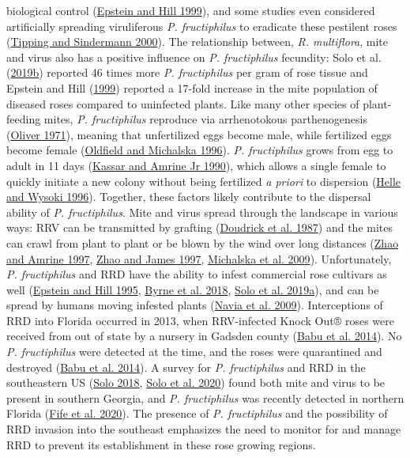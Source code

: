 \documentclass{ufdissertation}[overrideChapters] %
\begin{document}
{biological control (\protect\hyperlink{ref-Epstein1999}{Epstein and Hill 1999}), and some studies even considered artificially spreading viruliferous \emph{P. fructiphilus} to eradicate these pestilent roses (\protect\hyperlink{ref-Tipping2000}{Tipping and Sindermann 2000}). The relationship between, \emph{R. multiflora}, mite and virus also has a positive influence on \emph{P. fructiphilus} fecundity: Solo et al. (\protect\hyperlink{ref-Solo2019a}{2019b}) reported 46 times more \emph{P. fructiphilus} per gram of rose tissue and Epstein and Hill (\protect\hyperlink{ref-Epstein1999}{1999}) reported a 17-fold increase in the mite population of diseased roses compared to uninfected plants. Like many other species of plant-feeding mites, \emph{P. fructiphilus} reproduce via arrhenotokous parthenogenesis (\protect\hyperlink{ref-Oliver1971}{Oliver 1971}), meaning that unfertilized eggs become male, while fertilized eggs become female (\protect\hyperlink{ref-Oldfield1996b}{Oldfield and Michalska 1996}). \emph{P. fructiphilus} grows from egg to adult in 11 days (\protect\hyperlink{ref-Kassar1990}{Kassar and Amrine Jr 1990}), which allows a single female to quickly initiate a new colony without being fertilized \emph{a priori} to dispersion (\protect\hyperlink{ref-Helle1996}{Helle and Wysoki 1996}). Together, these factors likely contribute to the dispersal ability of \emph{P. fructiphilus}. Mite and virus spread through the landscape in various ways: RRV can be transmitted by grafting (\protect\hyperlink{ref-Doudrick1987}{Doudrick et al. 1987}) and the mites can crawl from plant to plant or be blown by the wind over long distances (\protect\hyperlink{ref-Zhao1997b}{Zhao and Amrine 1997}, \protect\hyperlink{ref-Zhao1997a}{Zhao and James 1997}, \protect\hyperlink{ref-Michalska2009}{Michalska et al. 2009}). Unfortunately, \emph{P. fructiphilus} and RRD have the ability to infest commercial rose cultivars as well (\protect\hyperlink{ref-Epstein1995}{Epstein and Hill 1995}, \protect\hyperlink{ref-Byrne2018}{Byrne et al. 2018}, \protect\hyperlink{ref-Solo2019}{Solo et al. 2019a}), and can be spread by humans moving infested plants (\protect\hyperlink{ref-Navia2009}{Navia et al. 2009}). Interceptions of RRD into Florida occurred in 2013, when RRV-infected Knock Out® roses were received from out of state by a nursery in Gadsden county (\protect\hyperlink{ref-Babu2014}{Babu et al. 2014}). No \emph{P. fructiphilus} were detected at the time, and the roses were quarantined and destroyed (\protect\hyperlink{ref-Babu2014}{Babu et al. 2014}). A survey for \emph{P. fructiphilus} and RRD in the southeastern US (\protect\hyperlink{ref-Solo2018}{Solo 2018}, \protect\hyperlink{ref-Solo2020}{Solo et al. 2020}) found both mite and virus to be present in southern Georgia, and \emph{P. fructiphilus} was recently detected in northern Florida (\protect\hyperlink{ref-Fife2020}{Fife et al. 2020}). The presence of \emph{P. fructiphilus} and the possibility of RRD invasion into the southeast emphasizes the need to monitor for and manage RRD to prevent its establishment in these rose growing regions.
\begin{figure}


\end{figure}}
\end{document}
